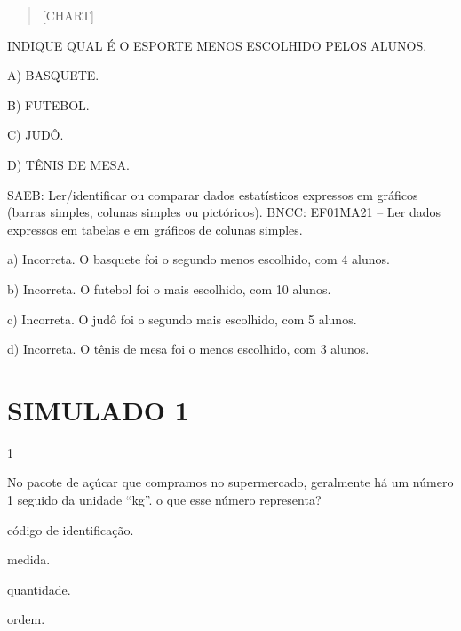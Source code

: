 {{\begin{quote}
{{[}CHART{]}}
\end{quote}

INDIQUE QUAL É O ESPORTE MENOS ESCOLHIDO PELOS ALUNOS.

A) BASQUETE.

B) FUTEBOL.

C) JUDÔ.

D) TÊNIS DE MESA.

SAEB:
Ler/identificar ou comparar dados estatísticos expressos em gráficos
(barras simples, colunas simples ou pictóricos).
BNCC: EF01MA21 -- Ler dados expressos em tabelas e em gráficos de colunas
simples.

a) Incorreta. O basquete foi o segundo menos escolhido, com 4 alunos.

b) Incorreta. O futebol foi o mais escolhido, com 10 alunos.

c) Incorreta. O judô foi o segundo mais escolhido, com 5 alunos.

d) Incorreta. O tênis de mesa foi o menos escolhido, com 3 alunos.

\chapter{SIMULADO 1}

\num{1}

No pacote de açúcar que compramos no supermercado, geralmente há um número
1 seguido da unidade ``kg''. o que esse número representa?

\begin{escolha}
\item código de identificação.

\item medida.

\item quantidade.

\item ordem.
\end{escolha}

}}
